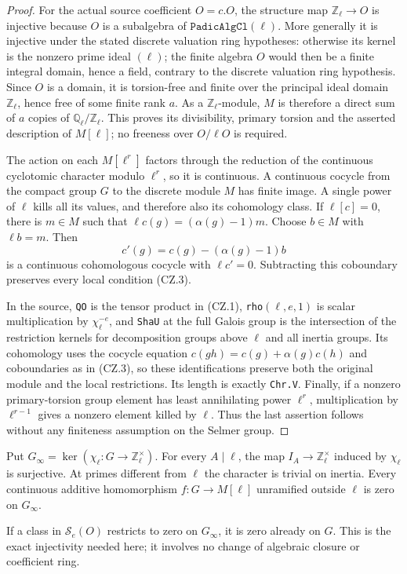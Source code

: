 \begin{proof}
For the actual source coefficient $O=c.O$, the structure map
$\mathbb Z_\ell\to O$ is injective because $O$ is a subalgebra
of $\texttt{PadicAlgCl}(\ell)$.  More generally it is injective
under the stated discrete valuation ring hypotheses: otherwise
its kernel is the nonzero prime ideal $(\ell)$; the finite algebra
$O$ would then be a finite integral domain, hence a field,
contrary to the discrete valuation ring hypothesis.  Since $O$ is
a domain, it is torsion-free and finite over the principal ideal
domain $\mathbb Z_\ell$, hence free of some finite rank $a$.
As a $\mathbb Z_\ell$-module, $M$ is therefore a direct sum of
$a$ copies of $\mathbb Q_\ell/\mathbb Z_\ell$.  This proves its
divisibility, primary torsion and the asserted description of
$M[\ell]$; no freeness over $O/\ell O$ is required.

The action on each $M[\ell^r]$ factors through the reduction of
the continuous cyclotomic character modulo $\ell^r$, so it is
continuous.  A continuous cocycle from the compact group $G$ to
the discrete module $M$ has finite image.  A single power of
$\ell$ kills all its values, and therefore also its cohomology
class.  If $\ell[c]=0$, there is $m\in M$ such that
$\ell c(g)=(\alpha(g)-1)m$.  Choose $b\in M$ with $\ell b=m$.
Then
\[
                c'(g)=c(g)-(\alpha(g)-1)b
                \tag{CZ.4}
\]
is a continuous cohomologous cocycle with $\ell c'=0$.
Subtracting this coboundary preserves every local condition (CZ.3).

In the source, \texttt{QO} is the tensor product in (CZ.1),
\texttt{rho}$(\ell,e,1)$ is scalar multiplication by
$\chi_\ell^{-e}$, and \texttt{ShaU} at the full Galois group is
the intersection of the restriction kernels for decomposition
groups above $\ell$ and all inertia groups.  Its cohomology uses
the cocycle equation
$c(gh)=c(g)+\alpha(g)c(h)$ and coboundaries as in (CZ.3), so
these identifications preserve both the original module and the
local restrictions.  Its length is exactly \texttt{Chr.V}.
Finally, if a nonzero primary-torsion group element has least
annihilating power $\ell^r$, multiplication by $\ell^{r-1}$
gives a nonzero element killed by $\ell$.  Thus the last
assertion follows without any finiteness assumption on the Selmer
group.
\end{proof}

\begin{proposition}
\label{prop:cz-cyclotomic-control}
Put $G_\infty=\ker(\chi_\ell:G\to\mathbb Z_\ell^\times)$.
For every $A\mid\ell$, the map
$I_A\to\mathbb Z_\ell^\times$ induced by $\chi_\ell$ is
surjective.  At primes different from $\ell$ the character is
trivial on inertia.  Every continuous additive homomorphism
$f:G\to M[\ell]$ unramified outside $\ell$ is zero on
$G_\infty$.

If a class in $\mathcal S_e(O)$ restricts to zero on $G_\infty$,
it is zero already on $G$.  This is the exact injectivity needed
here; it involves no change of algebraic closure or coefficient
ring.
\end{proposition}

